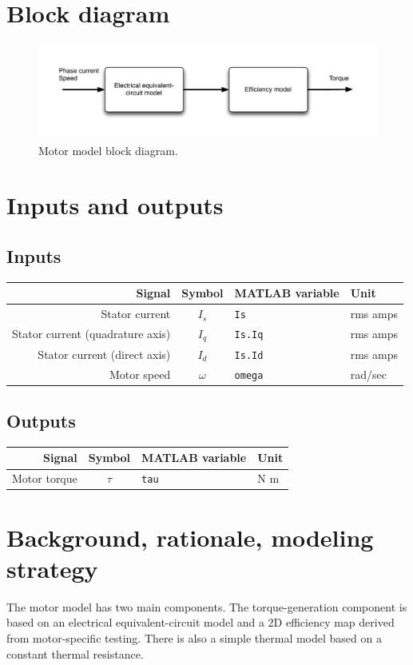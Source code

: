 \documentclass[../SimBALink.tex]{subfiles}
\begin{document}
\section{Block diagram}
	\begin{figure}[h]
			\centering
			\includegraphics[width=\linewidth]{Motor_block_diagram}
			\caption{Motor model block diagram.}
	\end{figure}
	\FloatBarrier

\section{Inputs and outputs}
	\subsection{Inputs}
	\begin{tabular}{ r | c | l | l }
		Signal						&	Symbol				&	MATLAB variable	&	Unit						\\\hline	
		Stator current					&	$I_s$				&	\texttt{Is}			&	rms amps					\\
		Stator current (quadrature axis)	&	$I_q$				&	\texttt{Is.Iq}		&	rms amps			\\
		Stator current (direct axis)		&	$I_d$				&	\texttt{Is.Id}		&	rms amps			\\
		Motor speed					&	$\omega$			&	\texttt{omega}		&	rad/sec
	\end{tabular}
	
	\subsection{Outputs}
		\begin{tabular}{ r | c | l | l }
			Signal						&	Symbol				&	MATLAB variable	&	Unit						\\\hline	
			Motor torque					&	$\tau$				&	\texttt{tau}		&		N m				\\
		\end{tabular}
	
\section{Background, rationale, modeling strategy}
	The motor model has two main components. The torque-generation component is based on an electrical equivalent-circuit model and a 2D efficiency map derived from motor-specific testing. There is also a simple thermal model based on a constant thermal resistance.
	
\end{document}
